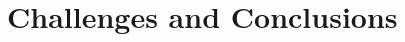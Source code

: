 \documentclass[harvard]{lincolncsuthesis}
\begin{document}
\chapter{Challenges and Conclusions} \label{ch:ch_cncl}


%





\printReferences
%
\end{document}
